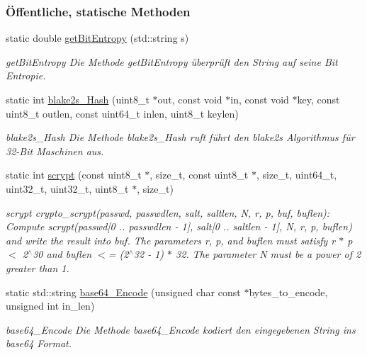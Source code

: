 \subsubsection*{Öffentliche, statische Methoden}
\begin{DoxyCompactItemize}
\item 
static double \hyperlink{classuCrypt_1_1uCryptLib_af460e066f8c91c19d70306efdd7704b3}{get\+Bit\+Entropy} (std\+::string s)
\begin{DoxyCompactList}\small\item\em get\+Bit\+Entropy Die Methode get\+Bit\+Entropy überprüft den String auf seine Bit Entropie. \end{DoxyCompactList}\item 
static int \hyperlink{classuCrypt_1_1uCryptLib_a72b831c97eb1fc974ad32a63931de4d3}{blake2s\+\_\+\+Hash} (uint8\+\_\+t $\ast$out, const void $\ast$in, const void $\ast$key, const uint8\+\_\+t outlen, const uint64\+\_\+t inlen, uint8\+\_\+t keylen)
\begin{DoxyCompactList}\small\item\em blake2s\+\_\+\+Hash Die Methode blake2s\+\_\+\+Hash ruft führt den blake2s Algorithmus für 32-\/\+Bit Maschinen aus. \end{DoxyCompactList}\item 
static int \hyperlink{classuCrypt_1_1uCryptLib_ac29c8bc8acdae72a1a16b705af8f463b}{scrypt} (const uint8\+\_\+t $\ast$, size\+\_\+t, const uint8\+\_\+t $\ast$, size\+\_\+t, uint64\+\_\+t, uint32\+\_\+t, uint32\+\_\+t, uint8\+\_\+t $\ast$, size\+\_\+t)
\begin{DoxyCompactList}\small\item\em scrypt crypto\+\_\+scrypt(passwd, passwdlen, salt, saltlen, N, r, p, buf, buflen)\+: Compute scrypt(passwd\mbox{[}0 .. passwdlen -\/ 1\mbox{]}, salt\mbox{[}0 .. saltlen -\/ 1\mbox{]}, N, r, p, buflen) and write the result into buf. The parameters r, p, and buflen must satisfy r $\ast$ p $<$ 2$^\wedge$30 and buflen $<$= (2$^\wedge$32 -\/ 1) $\ast$ 32. The parameter N must be a power of 2 greater than 1. \end{DoxyCompactList}\item 
static std\+::string \hyperlink{classuCrypt_1_1uCryptLib_a8538225a889f27d7c90330a086c651a9}{base64\+\_\+\+Encode} (unsigned char const $\ast$bytes\+\_\+to\+\_\+encode, unsigned int in\+\_\+len)
\begin{DoxyCompactList}\small\item\em base64\+\_\+\+Encode Die Methode base64\+\_\+\+Encode kodiert den eingegebenen String ins base64 Format. \end{DoxyCompactList}\item 

\end{DoxyCompactItemize}
